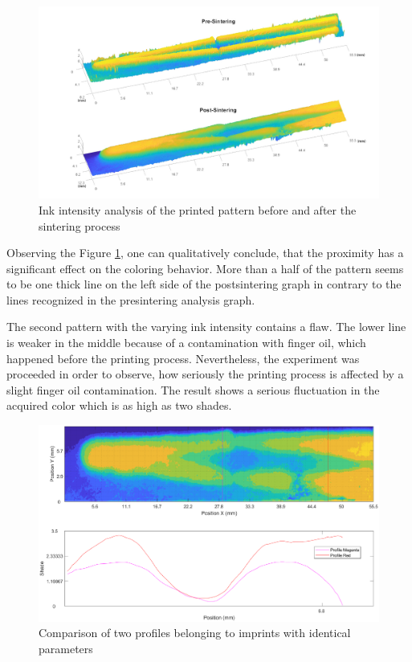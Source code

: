 \bigskip

\begin{figure}[H]
	\centering
	\includegraphics[width=1\textwidth]{grafiken/prepostV.jpg}
	\caption{Ink intensity analysis of the printed pattern before and after the sintering process}
	\label{fig:prepostV}
\end{figure} 

\bigskip

Observing the Figure \ref{fig:prepostV}, one can qualitatively conclude, that the proximity has a significant effect on the coloring behavior. More than a half of the pattern seems to be one thick line on the left side of the postsintering graph in contrary to the lines recognized in the presintering analysis graph. 

The second pattern with the varying ink intensity contains a flaw. The lower line is weaker in the middle because of a contamination with finger oil, which happened before the printing process. Nevertheless, the experiment was proceeded in order to observe, how seriously the printing process is affected by a slight finger oil contamination. The result shows a serious fluctuation in the acquired color which is as high as two shades. 



\bigskip

\begin{figure}[H]
	\centering
	\includegraphics[width=1\textwidth]{grafiken/vmatch.eps}
	\caption{Comparison of two profiles belonging to imprints with identical parameters}
	\label{fig:vmatch}
\end{figure} 

